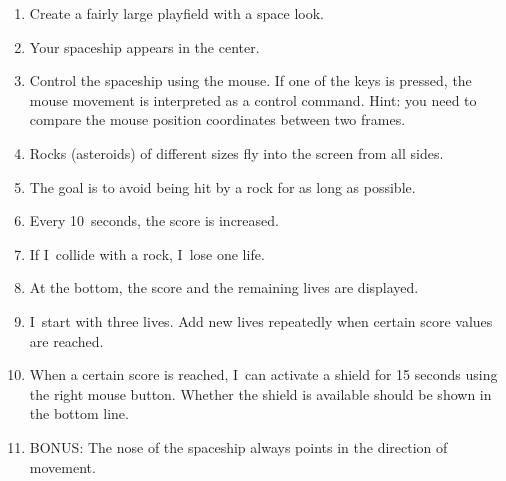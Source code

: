 \begin{enumerate}
	\item Create a fairly large playfield with a space look.
	\item Your spaceship appears in the center.
	\item Control the spaceship using the mouse. If one of the \keys{\shift} keys is pressed, the mouse movement is interpreted as a control command. Hint: you need to compare the mouse position coordinates between two frames.
	\item Rocks (asteroids) of different sizes fly into the screen from all sides.
	\item The goal is to avoid being hit by a rock for as long as possible.
	\item Every 10~seconds, the score is increased.
	\item If I~collide with a rock, I~lose one life.
	\item At the bottom, the score and the remaining lives are displayed.
	\item I~start with three lives. Add new lives repeatedly when certain score values are reached.
	\item When a certain score is reached, I~can activate a shield for 15 seconds using the right mouse button. Whether the shield is available should be shown in the bottom line.
	\item BONUS: The nose of the spaceship always points in the direction of movement.
\end{enumerate}

